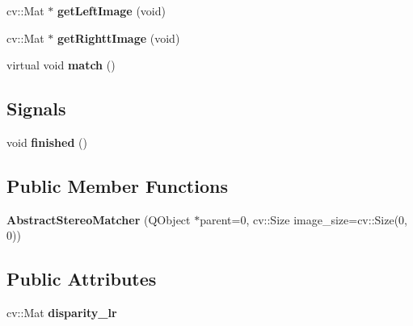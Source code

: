 \begin{DoxyCompactItemize}
\item 
\hypertarget{class_abstract_stereo_matcher_a23d41c7aa8ee75b83c0f86028854e92c}{}cv\+::\+Mat $\ast$ {\bfseries get\+Left\+Image} (void)\label{class_abstract_stereo_matcher_a23d41c7aa8ee75b83c0f86028854e92c}

\item 
\hypertarget{class_abstract_stereo_matcher_a3e1d35e2aed668657aa9441c5b563d2d}{}cv\+::\+Mat $\ast$ {\bfseries get\+Rightt\+Image} (void)\label{class_abstract_stereo_matcher_a3e1d35e2aed668657aa9441c5b563d2d}

\item 
\hypertarget{class_abstract_stereo_matcher_a49f42fbfee8266b81fbe17e8af07d73b}{}virtual void {\bfseries match} ()\label{class_abstract_stereo_matcher_a49f42fbfee8266b81fbe17e8af07d73b}

\end{DoxyCompactItemize}
\subsection*{Signals}
\begin{DoxyCompactItemize}
\item 
\hypertarget{class_abstract_stereo_matcher_ab28ce957fa500cd23cf8cfc474294a19}{}void {\bfseries finished} ()\label{class_abstract_stereo_matcher_ab28ce957fa500cd23cf8cfc474294a19}

\end{DoxyCompactItemize}
\subsection*{Public Member Functions}
\begin{DoxyCompactItemize}
\item 
\hypertarget{class_abstract_stereo_matcher_a17362bf0ea979b621a6e71178930b4b0}{}{\bfseries Abstract\+Stereo\+Matcher} (Q\+Object $\ast$parent=0, cv\+::\+Size image\+\_\+size=cv\+::\+Size(0, 0))\label{class_abstract_stereo_matcher_a17362bf0ea979b621a6e71178930b4b0}

\end{DoxyCompactItemize}
\subsection*{Public Attributes}
\begin{DoxyCompactItemize}
\item 
\hypertarget{class_abstract_stereo_matcher_aec41d8677f57e6db0f1851f4067e17dc}{}cv\+::\+Mat {\bfseries disparity\+\_\+lr}\label{class_abstract_stereo_matcher_aec41d8677f57e6db0f1851f4067e17dc}

\end{DoxyCompactItemize}
